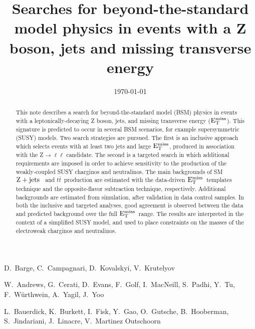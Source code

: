 \documentclass{cmspaper}
\newcommand{\zjets}{$\rm{Z}+\rm{jets}$ }
\newcommand{\ttbar}{\ensuremath{t\bar{t}}}
\newcommand{\MET}{\ensuremath{\rm{E_{T}^{miss}}}}
\begin{document}

\begin{titlepage}


  \date{\today}
 
  \title{Searches for beyond-the-standard model physics in events with a Z boson, jets and missing transverse energy}

  \begin{Authlist}
    D.~Barge, C.~Campagnari, D.~Kovalskyi, V.~Krutelyov

    W.~Andrews, G.~Cerati, D.~Evans, F.~Golf, I.~MacNeill, S.~Padhi, Y.~Tu, F.~W\"urthwein, 
	A.~Yagil, J.~Yoo

	L.~Bauerdick, K.~Burkett, I.~Fisk, Y.~Gao, O.~Gutsche, B.~Hooberman, S.~Jindariani, J.~Linacre, V.~Martinez Outschoorn
  \end{Authlist}

  \begin{abstract}

This note describes a search for beyond-the-standard model (BSM) physics in events with a leptonically-decaying Z boson, 
jets, and missing transverse energy (\MET).
This signature is predicted to occur in several BSM scenarios, for example supersymmetric (SUSY) models.
Two search strategies are pursued. The first is an inclusive approach which selects events with at least two jets and
large \MET, produced in association with the Z$\to\ell\ell$ candidate. The second is a targeted search 
in which additional requirements are imposed in order to achieve sensitivity to the production of the weakly-coupled
SUSY charginos and neutralinos. The main backgrounds of SM \zjets\ and \ttbar\ production are estimated with the data-driven 
\MET\ templates technique and the opposite-flavor subtraction technique, respectively.
Additional backgrounds are estimated from simulation, after validation in data control samples. 
In both the inclusive and targeted analyses,  good agreement is observed between the data and predicted background over the full \MET\ range. 
The results are interpreted in the context of a simplified SUSY model, and used to place constraints on the masses of the electroweak
charginos and neutralinos.

\end{abstract}

\end{titlepage}
\end{document}
